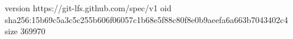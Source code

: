 version https://git-lfs.github.com/spec/v1
oid sha256:15b69c5a3c5c255b606f06057c1b68e5f88c80f8e0b9aeefa6a663b7043402c4
size 369970
